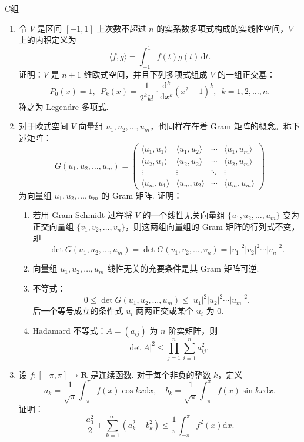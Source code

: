 \centerline{\heiti C组}
\begin{enumerate}
    \item 令 $V$ 是区间 $[-1, 1]$ 上次数不超过 $n$ 的实系数多项式构成的实线性空间，$V$ 上的内积定义为
          \[
              \langle f, g \rangle = \int_{-1}^{1} f(t)g(t)\,\mathrm{d}t.
          \]
          证明：$V$ 是 $n + 1$ 维欧式空间，并且下列多项式组成 $V$ 的一组正交基：
          \[
              P_0(x) = 1, \enspace P_k(x) = \dfrac{1}{2^k k!} \cdot \dfrac{\mathrm{d}^k}{\mathrm{d}x^k} (x^2 - 1)^k, \enspace k = 1, 2, \ldots, n.
          \]
          称之为 Legendre 多项式.
    \item 对于欧式空间 $V$ 向量组 $u_1, u_2, \ldots, u_m$，也同样存在着 Gram 矩阵的概念。称下述矩阵：
          \[
              G(u_1, u_2, \ldots, u_m) = \begin{pmatrix}
                  \langle u_1, u_1 \rangle & \langle u_1, u_2 \rangle & \cdots & \langle u_1, u_m \rangle \\
                  \langle u_2, u_1 \rangle & \langle u_2, u_2 \rangle & \cdots & \langle u_2, u_m \rangle \\
                  \vdots                   & \vdots                   & \ddots & \vdots                   \\
                  \langle u_m, u_1 \rangle & \langle u_m, u_2 \rangle & \cdots & \langle u_m, u_m \rangle
              \end{pmatrix}
          \]
          为向量组 $u_1, u_2, \ldots, u_m$ 的 Gram 矩阵. 证明：
          \begin{enumerate}
              \item 若用 Gram-Schmidt 过程将 $ V $ 的一个线性无关向量组 $\{u_1, u_2, \ldots, u_m\}$ 变为正交向量组 $\{v_1, v_2, \ldots, v_n\}$，则这两组向量组的 Gram 矩阵的行列式不变，即
                    \[
                        \det G(u_1, u_2, \ldots, u_m) = \det G(v_1, v_2, \ldots, v_n) = \lvert v_1 \rvert^2 \lvert v_2 \rvert^2 \cdots \lvert v_n \rvert^2.
                    \]
              \item 向量组 $u_1, u_2, \ldots, u_m$ 线性无关的充要条件是其 Gram 矩阵可逆.
              \item 不等式：
                    \[
                        0 \leqslant \det G(u_1, u_2, \ldots, u_m) \leqslant \lvert u_1 \rvert^2 \lvert u_2 \rvert^2 \cdots \lvert u_m \rvert^2.
                    \]
                    后一个等号成立的条件式 $u_i$ 两两正交或某个 $u_i$ 为 0.
              \item Hadamard 不等式：$A = (a_{ij})$ 为 $n$ 阶实矩阵，则
                    \[
                        \lvert \det A \rvert^2 \leqslant \prod_{j = 1}^n \sum_{i = 1}^n a_{ij}^2.
                    \]
          \end{enumerate}
    \item 设 $f: [-\pi, \pi] \to \mathbf{R}$ 是连续函数. 对于每个非负的整数 $k$，定义
          \[
              a_k = \dfrac{1}{\sqrt{\pi}} \int_{-\pi}^{\pi} f(x) \cos kx \mathrm{d}x, \quad b_k = \dfrac{1}{\sqrt{\pi}} \int_{-\pi}^{\pi} f(x) \sin kx \mathrm{d}x.
          \]
          证明：\[
              \dfrac{a_0^2}{2} + \sum_{k = 1}^{\infty} (a_k^2 + b_k^2) \leqslant \dfrac{1}{\pi} \int_{-\pi}^{\pi} f^2(x) \mathrm{d}x.
          \]
\end{enumerate}
